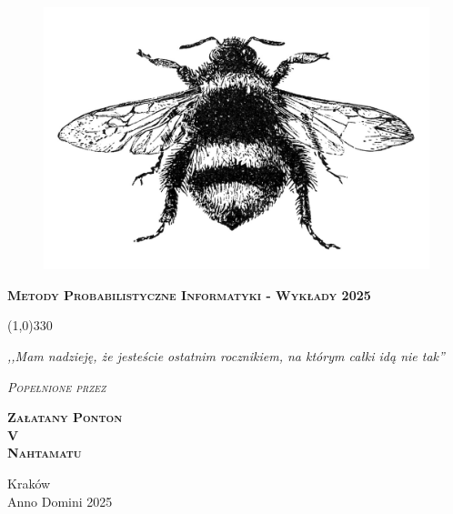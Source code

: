 \begin{titlepage}

	\begin{center}
		\begin{figure}[h]
			\centering
			\includegraphics[scale=0.75]{img/bumblebee.jpg}
		\end{figure}
		\vspace{0.5cm}
		\Huge
		\textbf{\textsc{Metody Probabilistyczne Informatyki - Wykłady 2025}}

		\normalsize

		\line(1,0){330}

		\vspace{1cm}
		
		\textit{,,Mam nadzieję, że jesteście ostatnim rocznikiem, na którym całki idą nie tak''}
		\vspace{1cm}

		\textit{\textsc{Popełnione przez}}\\
		\vspace{5mm}

		\textbf{\textsc{
				Załatany Ponton \\
				V\\
				Nahtamatu\\
			}}
		\vfill

		Kraków \\
		Anno Domini 2025

	\end{center}

\end{titlepage}
